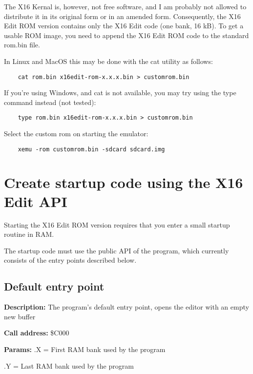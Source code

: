 \documentclass{article}
\begin{document}
    The X16 Kernal is, however, not free software, and I am probably not allowed to distribute it in its
    original form or in an amended form. Consequently, the X16 Edit ROM version contains only the X16 Edit code (one bank, 16 kB). To get a 
    usable ROM image, you need to append the X16 Edit ROM code to the standard
    rom.bin file.

    In Linux and MacOS this may be done with the cat utility as follows: 
    
    \begin{verbatim}
    cat rom.bin x16edit-rom-x.x.x.bin > customrom.bin
    \end{verbatim}

    If you're using Windows, and cat is not available, you may try using the type command instead (not tested):
    
    \begin{verbatim}
    type rom.bin x16edit-rom-x.x.x.bin > customrom.bin
    \end{verbatim}

    Select the custom rom on starting the emulator: 
    
    \begin{verbatim}
    xemu -rom customrom.bin -sdcard sdcard.img
    \end{verbatim}

\section{Create startup code using the X16 Edit API}

    Starting the X16 Edit ROM version requires that you enter a small startup
    routine in RAM.

    The startup code must use the public API of the program, which currently
    consists of the entry points described below.

    \subsection{Default entry point}

        \begin{hangparas}{3cm}{1}

            \textbf{Description:} \tabto{3cm} The program's default entry point, opens the editor with an empty new buffer

            \textbf{Call address:} \tabto{3cm}\$C000

            \textbf{Params:} \tabto{3cm}.X = First RAM bank used by the program
        
            \tabto{3cm}.Y = Last RAM bank used by the program

        \end{hangparas}
\end{document}
